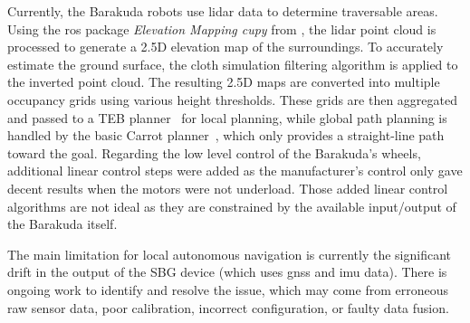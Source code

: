 Currently, the Barakuda robots use \gls{lidar} data to determine traversable areas.
Using the \gls{ros} package \textit{Elevation Mapping cupy} from \textcite{miki_elevation_2022}, the \gls{lidar} point cloud is processed to generate a 2.5D elevation map of the surroundings.
To accurately estimate the ground surface, the cloth simulation filtering algorithm is applied to the inverted point cloud.
The resulting 2.5D maps are converted into multiple occupancy grids using various height thresholds.
These grids are then aggregated and passed to a TEB planner~\cite{noauthor_teb_local_planner_nodate} for local planning, while
global path planning is handled by the basic Carrot planner~\cite{noauthor_carrot_planner_nodate}, which only provides a straight-line path toward the goal.
Regarding the low level control of the Barakuda's wheels, additional linear control steps were added as the manufacturer's
control only gave decent results when the motors were not underload.
Those added linear control algorithms are not ideal as they are constrained by the available input/output of the
Barakuda itself.

The main limitation for local autonomous navigation is currently the significant drift in the output of the SBG device (which uses \gls{gnss} and \gls{imu} data).
There is ongoing work to identify and resolve the issue, which may come from erroneous raw sensor data, poor calibration, incorrect configuration, or faulty data fusion.

